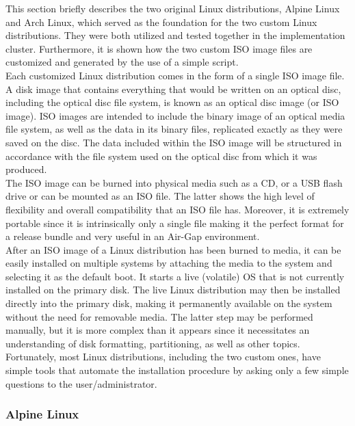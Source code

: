 This section briefly describes the two original Linux distributions, Alpine
Linux and Arch Linux, which served as the foundation for the two custom Linux distributions.
They were both utilized and tested together in the implementation cluster. Furthermore,
it is shown how the two custom ISO image files are customized and generated by
the use of a simple script. \\ %
Each customized Linux distribution comes in the form of a single ISO image file.
A disk image that contains everything that would be written on an optical disc,
including the optical disc file system, is known as an optical disc image (or
ISO image). ISO images are intended to include the binary image of an optical
media file system, as well as the data in its binary files, replicated exactly
as they were saved on the disc. The data included within the ISO image will be structured
in accordance with the file system used on the optical disc from which it was produced\cite{iso}.
\\ %
The ISO image can be burned into physical media such as a CD, or a USB flash drive
or can be mounted as an ISO file. The latter shows the high level of flexibility
and overall compatibility that an ISO file has. Moreover, it is extremely
portable since it is intrinsically only a single file making it the perfect
format for a release bundle and very useful in an Air-Gap environment. \\ %
After an ISO image of a Linux distribution has been burned to media, it can be easily
installed on multiple systems by attaching the media to the system and selecting
it as the default boot. It starts a live (volatile) OS that is not currently
installed on the primary disk. The live Linux distribution may then be installed
directly into the primary disk, making it permanently available on the system
without the need for removable media. The latter step may be performed manually,
but it is more complex than it appears since it necessitates an understanding of
disk formatting, partitioning, as well as other topics. Fortunately, most Linux
distributions, including the two custom ones, have simple tools that automate
the installation procedure by asking only a few simple questions to the user/administrator.

\subsubsection{Alpine Linux}
\label{subsubsec:implementation_distributions_iso_alpine_linux}

